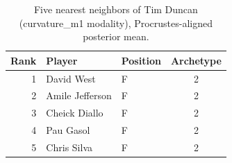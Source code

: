 \begin{table}[htbp]
  \centering\small
  \begin{tabular}{rllc}
    \toprule
    Rank & Player & Position & Archetype \\
    \midrule
    1 & David West & F & 2 \\
    2 & Amile Jefferson & F & 2 \\
    3 & Cheick Diallo & F & 2 \\
    4 & Pau Gasol & F & 2 \\
    5 & Chris Silva & F & 2 \\
    \bottomrule
  \end{tabular}
  \caption{Five nearest neighbors of Tim Duncan (curvature_m1 modality), Procrustes-aligned posterior mean.}
  \label{tab:Tim_Duncan_neighbors_curvature_m1}
\end{table}

